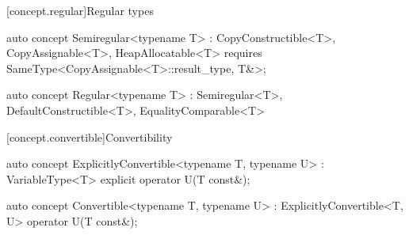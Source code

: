 \documentclass[american,twoside]{book}
\begin{document}
\begin{itemdescr}
\pnum
{}
\end{itemdescr}

[concept.regular]{Regular types}

\begin{itemdecl}
auto concept Semiregular<typename T> : CopyConstructible<T>, CopyAssignable<T>, HeapAllocatable<T> { 
  requires SameType<CopyAssignable<T>::result_type, T&>;
}
\end{itemdecl}

\begin{itemdescr}
\pnum 
{}
\end{itemdescr}

\begin{itemdecl}
auto concept Regular<typename T> 
  : Semiregular<T>, DefaultConstructible<T>, EqualityComparable<T> { }
\end{itemdecl}

\begin{itemdescr}
\pnum
{}
\end{itemdescr}

[concept.convertible]{Convertibility}

\begin{itemdecl}
auto concept ExplicitlyConvertible<typename T, typename U> : VariableType<T> {
  explicit operator U(T const&);
}
\end{itemdecl}

\begin{itemdescr}
\pnum
{}
\end{itemdescr}

\begin{itemdecl}
auto concept Convertible<typename T, typename U> : ExplicitlyConvertible<T, U> {
  operator U(T const&);
}
\end{itemdecl}

\begin{itemdescr}
\pnum
{}
\end{itemdescr}
\end{document}
